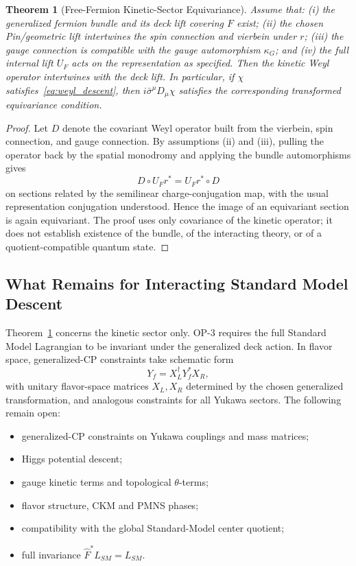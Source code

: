 \documentclass[11pt]{article}
\theoremstyle{canonmath}
\newtheorem{theorem}{Theorem}[section]
\theoremstyle{canonpostulate}
\theoremstyle{canonclaim}
\def\mathrm#1{#1}%
\def\mathcal#1{#1}%
\begin{document}
\begin{theorem}[Free-Fermion Kinetic-Sector Equivariance] \label{thm:dirac_comm}
Assume that: (i) the generalized fermion bundle and its deck lift covering $F$ exist; (ii) the chosen Pin/geometric lift intertwines the spin connection and vierbein under $r$; (iii) the gauge connection is compatible with the gauge automorphism $\kappa_G$; and (iv) the full internal lift $U_F$ acts on the representation as specified. Then the kinetic Weyl operator intertwines with the deck lift. In particular, if $\chi$ satisfies~\eqref{eq:weyl_descent}, then $i\bar\sigma^\mu D_\mu\chi$ satisfies the corresponding transformed equivariance condition.
\end{theorem}
\begin{proof}
Let $D$ denote the covariant Weyl operator built from the vierbein, spin connection, and gauge connection. By assumptions (ii) and (iii), pulling the operator back by the spatial monodromy and applying the bundle automorphisms gives
\begin{equation}
D\circ U_F r^* = U_F r^*\circ D
\end{equation}
on sections related by the semilinear charge-conjugation map, with the usual representation conjugation understood. Hence the image of an equivariant section is again equivariant. The proof uses only covariance of the kinetic operator; it does not establish existence of the bundle, of the interacting theory, or of a quotient-compatible quantum state.
\end{proof}

\subsection{What Remains for Interacting Standard Model Descent}

Theorem~\ref{thm:dirac_comm} concerns the kinetic sector only. OP-3 requires the full Standard Model Lagrangian to be invariant under the generalized deck action. In flavor space, generalized-CP constraints take schematic form
\begin{equation}
Y_f = X_L^\dagger Y_f^*X_R,
\end{equation}
with unitary flavor-space matrices $X_L,X_R$ determined by the chosen generalized transformation, and analogous constraints for all Yukawa sectors. The following remain open:
\begin{itemize}
\item generalized-CP constraints on Yukawa couplings and mass matrices;
\item Higgs potential descent;
\item gauge kinetic terms and topological $\theta$-terms;
\item flavor structure, CKM and PMNS phases;
\item compatibility with the global Standard-Model center quotient;
\item full invariance $\widehat F^*\mathcal L_{\mathrm{SM}}=\mathcal L_{\mathrm{SM}}$.
\end{itemize}
\end{document}
